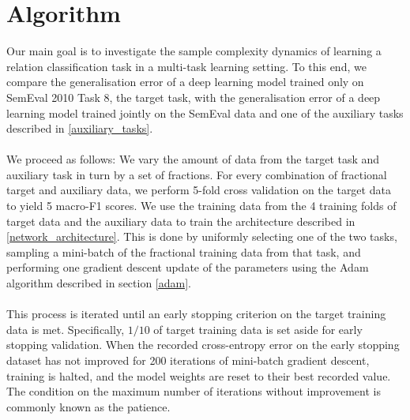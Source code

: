 \section{Algorithm}

Our main goal is to investigate the sample complexity dynamics of learning a relation classification task in a multi-task learning setting. To this end, we compare the generalisation error of a deep learning model trained only on SemEval 2010 Task 8, the target task, with the generalisation error of a deep learning model trained jointly on the SemEval data and one of the auxiliary tasks described in \ref{auxiliary_tasks}.
\\\\
We proceed as follows: We vary the amount of data from the target task and auxiliary task in turn by a set of fractions. For every combination of fractional target and auxiliary data, we perform 5-fold cross validation on the target data to yield 5 macro-F1 scores. We use the training data from the 4 training folds of target data and the auxiliary data to train the architecture described in \ref{network_architecture}. This is done by uniformly selecting one of the two tasks, sampling a mini-batch of the fractional training data from that task, and performing one gradient descent update of the parameters using the Adam algorithm described in section \ref{adam}. 
\\\\
This process is iterated until an early stopping criterion on the target training data is met. Specifically, $1/10$ of target training data is set aside for early stopping validation. When the recorded cross-entropy error on the early stopping dataset has not improved for 200 iterations of mini-batch gradient descent, training is halted, and the model weights are reset to their best recorded value. The condition on the maximum number of iterations without improvement is commonly known as the patience. 

